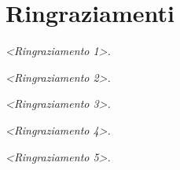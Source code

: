 \chapter*{Ringraziamenti}
\thispagestyle{empty}

\begin{flushleft}

\textit{<Ringraziamento 1>.}

\medskip

\textit{<Ringraziamento 2>.}

\medskip

\textit{<Ringraziamento 3>.}

\medskip

\textit{<Ringraziamento 4>.}

\medskip

\textit{<Ringraziamento 5>.}

\end{flushleft}
